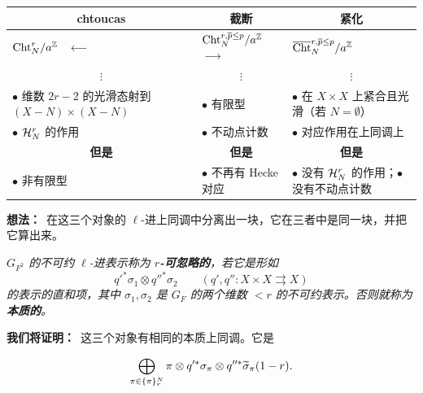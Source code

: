 \begin{center}
\renewcommand{\arraystretch}{1.35}
\begin{tabular}{p{4.4cm}p{4.4cm}p{4.4cm}}
\toprule
\multicolumn{1}{c}{chtoucas} & \multicolumn{1}{c}{截断} & \multicolumn{1}{c}{紧化}\\
\midrule
$\mathrm{Cht}^r_N/a^{\mathbb{Z}}$ \ $\xleftarrow{\quad\quad}$ & $\mathrm{Cht}^{r,\overline{p}\le p}_N/a^{\mathbb{Z}}$ \ $\xrightarrow{\quad\quad}$ & $\overline{\mathrm{Cht}}^{r,\overline{p}\le p}_N/a^{\mathbb{Z}}$\\[2pt]
\multicolumn{1}{c}{$\vdots$} & \multicolumn{1}{c}{$\vdots$} & \multicolumn{1}{c}{$\vdots$}\\[2pt]
$\bullet$ 维数 $2r-2$ 的光滑态射到 $(X - N) \times (X - N)$
& $\bullet$ 有限型
& $\bullet$ 在 $X \times X$ 上紧合且光滑（若 $N = \emptyset$）\\
$\bullet$ $\mathcal{H}^r_N$ 的作用
& $\bullet$ 不动点计数
& $\bullet$ 对应作用在上同调上\\
\midrule
\multicolumn{1}{c}{\textbf{但是}} & \multicolumn{1}{c}{\textbf{但是}} & \multicolumn{1}{c}{\textbf{但是}}\\
\midrule
$\bullet$ 非有限型
& $\bullet$ 不再有 Hecke 对应
& $\bullet$ 没有 $\mathcal{H}^r_N$ 的作用；\newline $\bullet$ 没有不动点计数\\
\bottomrule
\end{tabular}
\end{center}

\par\medskip
\noindent\textbf{想法：}\ 在这三个对象的 $\ell$-进上同调中分离出一块，它在三者中是同一块，并把它算出来。

\begin{definition*}
\emph{$G_{F^2}$ 的不可约 $\ell$-进表示称为 \textbf{$r$-可忽略的}，若它是形如}
\[ q'^*\sigma_1 \otimes q''^*\sigma_2 \qquad (q', q'' : X \times X \rightrightarrows X) \]
\emph{的表示的直和项，其中 $\sigma_1, \sigma_2$ 是 $G_F$ 的两个维数 $< r$ 的不可约表示。否则就称为\textbf{本质的}。}
\end{definition*}

\par\medskip
\noindent\textbf{我们将证明：}\ 这三个对象有相同的本质上同调。它是

\[ \bigoplus_{\pi \in \{\pi\}^N_r} \pi \otimes q'^*\sigma_\pi \otimes q''^*\widetilde{\sigma}_\pi(1 - r). \]
